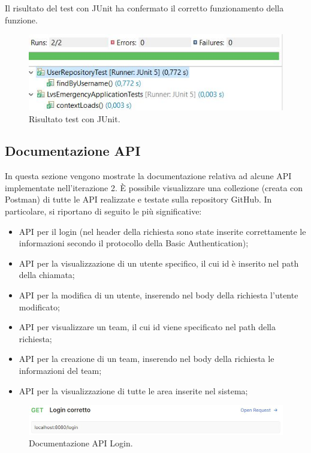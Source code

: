 

Il risultato del test con JUnit ha confermato il corretto funzionamento della funzione.

\begin{figure}[h!]
	\centering
	\includegraphics[width=1\linewidth]{./Iterazione 2/ImageFiles/TestJUnit}
	\caption{Risultato test con JUnit.}
	\label{fig:RisultatiTestJunitIT2}
\end{figure}

\subsection{Documentazione API}

In questa sezione vengono mostrate la documentazione relativa ad alcune API implementate nell'iterazione 2. \`E possibile visualizzare una collezione (creata con Postman) di tutte le API realizzate e testate sulla repository GitHub. In particolare, si riportano di seguito le più significative:
\begin{itemize}
	\item API per il login (nel header della richiesta sono state inserite correttamente le informazioni secondo il protocollo della Basic Authentication);
	\item API per la visualizzazione di un utente specifico, il cui id è inserito nel path della chiamata;
	\item API per la modifica di un utente, inserendo nel body della richiesta l'utente modificato;
	\item API per visualizzare un team, il cui id viene specificato nel path della richiesta;
	\item API per la creazione di un team, inserendo nel body della richiesta le informazioni del team;
	\item API per la visualizzazione di tutte le area inserite nel sistema;
\end{itemize}

\begin{figure}[h!]
	\centering
	\includegraphics[width=1\linewidth]{./Iterazione 2/ImageFiles/LoginCorrettoRequest}
	
	\caption{Documentazione API Login.}
	\label{fig:LoginAPI}
\end{figure}

